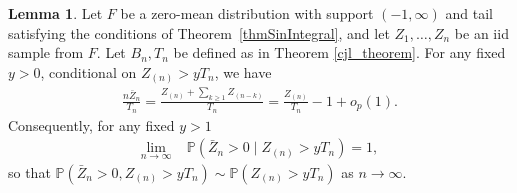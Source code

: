 \documentclass[11pt]{article}
\theoremstyle{definition}
\newtheorem{lemma}{Lemma}[section]
\def\Prob{{\mathbb P}}
\begin{document}
\begin{lemma}
	\label{lem:sum-max-dependence}
	Let $F$ be a zero-mean distribution with support $(-1, \infty)$ and tail satisfying the conditions of Theorem~\ref{thmSinIntegral}, and let $Z_1,\ldots, Z_n$ be an iid sample from $F$. Let $B_n,T_n$ be defined as in Theorem \ref{cjl_theorem}. For any fixed $y>0$, conditional on $Z_{(n)}>y T_n$, we have
	\begin{align}
	\label{eq:sum-max-dependence}
	\frac{n\bar{Z}_{n}}{T_n} = \frac{Z_{(n)}+\sum_{k\geq 1}Z_{(n-k)}}{T_n} = \frac{Z_{(n)}}{T_n}-1+o_p(1).
	\end{align}
	Consequently, for any fixed $y>1$
	\begin{align*}
	\lim_{n\to\infty} \; &\Prob\left( \bar{Z}_n>0 \mid Z_{(n)}>yT_n \right) = 1,
	\end{align*}
	so that $\Prob(\bar{Z}_n>0, Z_{(n)}>yT_n) \sim \Prob(Z_{(n)}>yT_n)$ as $n\to\infty$.
\end{lemma}
\end{document}
